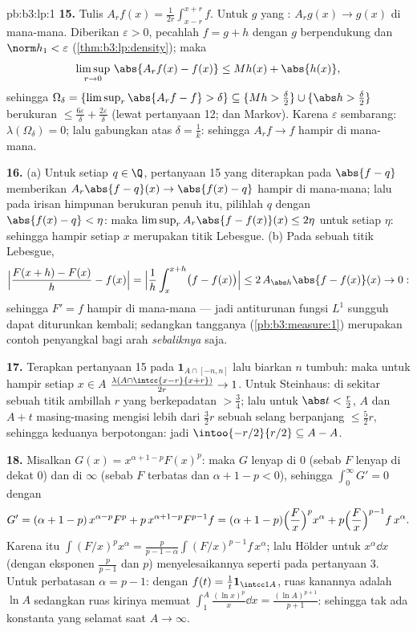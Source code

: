 \begin{solution}{pb:b3:lp:1}
\textbf{15.} Tulis $A_rf(x) = \frac1{2r}\int_{x-r}^{x+r}f$.
Untuk $g$ yang : $A_rg(x) \to g(x)$ di mana-mana. Diberikan
$\varepsilon > 0$, pecahlah $f = g + h$ dengan $g$  berpendukung
 dan $\norm h_1 < \varepsilon$
(\cref{thm:b3:lp:density}); maka
\[
\limsup_{r\to0}\,\abs{A_rf(x) - f(x)} \leq Mh(x) +
\abs{h(x)},
\]
sehingga $\Omega_\delta = \{\limsup_r\abs{A_rf - f} > \delta\}
\subseteq \{Mh > \tfrac\delta2\} \cup \{\abs h >
\tfrac\delta2\}$ berukuran $\leq \frac{6\varepsilon}\delta
+ \frac{2\varepsilon}\delta$ (lewat pertanyaan 12; dan Markov).
Karena $\varepsilon$ sembarang: $\lambda(\Omega_\delta) = 0$; lalu gabungkan
atas $\delta = \frac1k$: sehingga $A_rf \to f$ hampir di mana-mana.

\textbf{16.} (a) Untuk setiap $q \in \Q$, pertanyaan 15 yang diterapkan pada
$\abs{f - q}$ memberikan $A_r\abs{f - q}(x) \to \abs{f(x) - q}$
hampir di mana-mana; lalu pada irisan himpunan berukuran penuh itu, pilihlah
$q$ dengan $\abs{f(x) - q} < \eta$:
maka $\limsup_rA_r\abs{f - f(x)}(x) \leq 2\eta$ untuk setiap $\eta$: sehingga
hampir setiap $x$ merupakan titik Lebesgue. (b) Pada sebuah titik
Lebesgue,
\[
\Bigl|\frac{F(x + h) - F(x)}h - f(x)\Bigr|
= \Bigl|\frac1h\int_x^{x+h}\bigl(f - f(x)\bigr)\Bigr|
\leq 2\,A_{\abs h}\abs{f - f(x)}(x) \to 0 :
\]
sehingga $F' = f$ hampir di mana-mana --- jadi antiturunan fungsi $L^1$ sungguh
dapat diturunkan kembali; sedangkan tangganya (\cref{pb:b3:measure:1})
merupakan contoh penyangkal bagi arah \emph{sebaliknya} saja.

\textbf{17.} Terapkan pertanyaan 15 pada $\mathbf 1_{A\cap[-n,n]}$
lalu biarkan $n$ tumbuh: maka untuk hampir setiap $x \in A$ 
$\frac{\lambda(A\cap\intcc{x-r}{x+r})}{2r} \to 1$. Untuk Steinhaus:
di sekitar sebuah titik  ambillah $r$ yang berkepadatan $> \frac34$;
lalu untuk $\abs t < \frac r2$, $A$ dan $A + t$ masing-masing mengisi lebih dari
$\frac32r$ sebuah selang berpanjang $\leq \frac52r$, sehingga
keduanya berpotongan: jadi $\intoo{-r/2}{r/2} \subseteq A - A$.

\textbf{18.} Misalkan $G(x) = x^{\alpha+1-p}F(x)^p$: maka $G$ lenyap
di $0$ (sebab $F$ lenyap di dekat $0$) dan di $\infty$ (sebab $F$ terbatas dan
$\alpha + 1 - p < 0$), sehingga $\int_0^\infty G' = 0$ dengan
\[
G' = (\alpha + 1 - p)\,x^{\alpha-p}F^p +
p\,x^{\alpha+1-p}F^{p-1}f
= (\alpha + 1 - p)\Bigl(\frac Fx\Bigr)^px^\alpha +
p\Bigl(\frac Fx\Bigr)^{p-1}f\,x^\alpha .
\]
Karena itu $\int(F/x)^px^\alpha = \frac{p}{p-1-\alpha}
\int(F/x)^{p-1}f\,x^\alpha$; lalu Hölder untuk 
$x^\alpha\dd x$ (dengan eksponen $\frac p{p-1}$ dan $p$) menyelesaikannya
seperti pada pertanyaan 3. Untuk perbatasan $\alpha = p - 1$: dengan $f(t) =
\frac1t\mathbf 1_{\intcc1A}$, ruas kanannya adalah $\ln A$
sedangkan ruas kirinya memuat $\int_1^A\frac{(\ln x)^p}x\dd x =
\frac{(\ln A)^{p+1}}{p+1}$: sehingga tak ada konstanta yang selamat saat $A \to
\infty$.


\end{solution}
